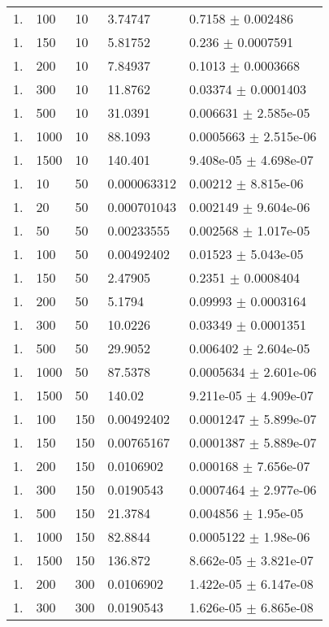 \begin{longtable}{lllll}
  1. &   100 &    10 &  3.74747 &   0.7158 $\pm$ 0.002486 \\
  1. &   150 &    10 &  5.81752 &    0.236 $\pm$ 0.0007591 \\
  1. &   200 &    10 &  7.84937 &   0.1013 $\pm$ 0.0003668 \\
  1. &   300 &    10 &  11.8762 &  0.03374 $\pm$ 0.0001403 \\
  1. &   500 &    10 &  31.0391 & 0.006631 $\pm$ 2.585e-05 \\
  1. &  1000 &    10 &  88.1093 & 0.0005663 $\pm$ 2.515e-06 \\
  1. &  1500 &    10 &  140.401 & 9.408e-05 $\pm$ 4.698e-07 \\
  1. &    10 &    50 & 0.000063312 &  0.00212 $\pm$ 8.815e-06 \\
  1. &    20 &    50 & 0.000701043 & 0.002149 $\pm$ 9.604e-06 \\
  1. &    50 &    50 & 0.00233555 & 0.002568 $\pm$ 1.017e-05 \\
  1. &   100 &    50 & 0.00492402 &  0.01523 $\pm$ 5.043e-05 \\
  1. &   150 &    50 &  2.47905 &   0.2351 $\pm$ 0.0008404 \\
  1. &   200 &    50 &   5.1794 &  0.09993 $\pm$ 0.0003164 \\
  1. &   300 &    50 &  10.0226 &  0.03349 $\pm$ 0.0001351 \\
  1. &   500 &    50 &  29.9052 & 0.006402 $\pm$ 2.604e-05 \\
  1. &  1000 &    50 &  87.5378 & 0.0005634 $\pm$ 2.601e-06 \\
  1. &  1500 &    50 &   140.02 & 9.211e-05 $\pm$ 4.909e-07 \\
  1. &   100 &   150 & 0.00492402 & 0.0001247 $\pm$ 5.899e-07 \\
  1. &   150 &   150 & 0.00765167 & 0.0001387 $\pm$ 5.889e-07 \\
  1. &   200 &   150 & 0.0106902 & 0.000168 $\pm$ 7.656e-07 \\
  1. &   300 &   150 & 0.0190543 & 0.0007464 $\pm$ 2.977e-06 \\
  1. &   500 &   150 &  21.3784 & 0.004856 $\pm$ 1.95e-05 \\
  1. &  1000 &   150 &  82.8844 & 0.0005122 $\pm$ 1.98e-06 \\
  1. &  1500 &   150 &  136.872 & 8.662e-05 $\pm$ 3.821e-07 \\
  1. &   200 &   300 & 0.0106902 & 1.422e-05 $\pm$ 6.147e-08 \\
  1. &   300 &   300 & 0.0190543 & 1.626e-05 $\pm$ 6.865e-08 \\

\end{longtable}
